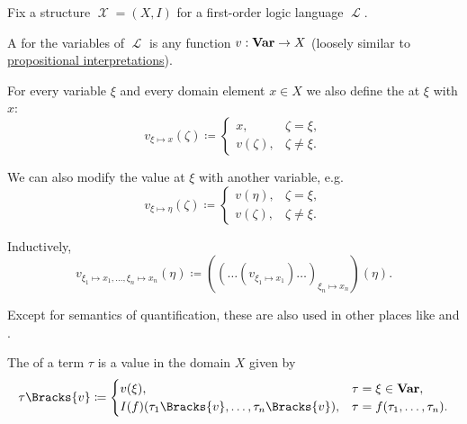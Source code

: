 \begin{definition}\label{def:first_order_valuation}
  Fix a structure \( \mscrX = (X, I) \) for a first-order logic language \( \mscrL \).

  \begin{thmenum}
     A  for the variables of \( \mscrL \) is any function \( v: \operatorname{\mathbf{Var}} \to X \) (loosely similar to \hyperref[def:propositional_valuation/interpretation]{propositional interpretations}).

     For every variable \( \xi \) and every domain element \( x \in X \) we also define the  at \( \xi \) with \( x \):
    \begin{equation*}
      v_{\xi \mapsto x}(\zeta) \coloneqq \begin{cases}
        x,        &\zeta = \xi, \\
        v(\zeta), &\zeta \neq \xi.
      \end{cases}
    \end{equation*}

    We can also modify the value at \( \xi \) with another variable, e.g.
    \begin{equation*}
      v_{\xi \mapsto \eta}(\zeta) \coloneqq \begin{cases}
        v(\eta),  &\zeta = \xi, \\
        v(\zeta), &\zeta \neq \xi.
      \end{cases}
    \end{equation*}

    Inductively,
    \begin{equation*}
      v_{\xi_1 \mapsto x_1, \ldots, \xi_n \mapsto x_n}(\eta) \coloneqq ((\ldots(v_{\xi_1 \mapsto x_1})\ldots)_{\xi_n \mapsto x_n})(\eta).
    \end{equation*}

    Except for semantics of quantification, these are also used in other places like  and .

     The  of a term \( \tau \) is a value in the domain \( X \) given by
    \begin{equation}\label{eq:def:first_order_valuation/term_valuation}
      \tau\Bracks{v} \coloneqq \begin{cases}
        v(\xi),                                           &\tau = \xi \in \boldop{Var}, \\
        I(f)(\tau_1\Bracks{v}, \ldots, \tau_n\Bracks{v}), &\tau = f(\tau_1, \ldots, \tau_n).
      \end{cases}
    \end{equation}


\end{thmenum}
\end{definition}
